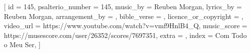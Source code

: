 
[
    id                     = {145},
    psalterio_number       = {145},
    music_by               = {Reuben Morgan},
    lyrics_by              = {Reuben Morgan},
    arrangement_by         = {},
    bible_verse            = {},
    licence_or_copyright   = {},
    video_url              = {https://www.youtube.com/watch?v=vmf9HnlB4_Q},
    music_score            = {https://musescore.com/user/26352/scores/7697351},
    extra                  = {},
    index                  = {Com Todo o Meu Ser},
]


\beginverse


